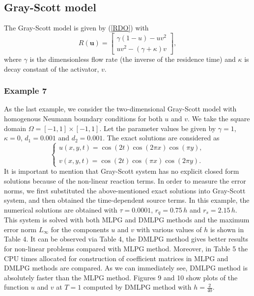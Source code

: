 \documentclass[12pt]{article}
\numberwithin{equation}{section}
\begin{document}
\subsection{Gray-Scott model}
The Gray-Scott model \cite{Fernandes, ZhangK} is given by (\ref{RDO}) with
\begin{equation}
R(\mathbf u) = \left[ \begin{array}{l}
\gamma (1- u )- u{v^2}\\
u{v^2}-(\gamma+\kappa)v
\end{array} \right],\end{equation}
where $\gamma$
is the dimensionless flow rate (the inverse of the residence time) and $\kappa$ is decay constant of the activator, $v$.

\subsubsection{Example 7}
As the last example, we consider the two-dimensional Gray-Scott model with homogenous Neumann boundary conditions for both $u$ and $v$. We take the square domain $\Omega  = [-1,1] \times [-1,1]$. Let the parameter values be given by
$\gamma =1$, $\kappa =0$, $d_1=0.001$ and $d_2=0.001$. The exact solutions are considered as \cite{Fernandes, ZhangK}
\[\left\{ {\begin{array}{*{20}{l}}
{u(x,y,t) = \cos (2t)\cos (2\pi x)\cos (\pi y),}\\
{}\\
{v(x,y,t) = \cos (2t)\cos (\pi x)\cos (2\pi y).}
\end{array}} \right.\]
It is important to mention that Gray-Scott system has no explicit closed form solutions because of the non-linear reaction
terms. In order to measure the error norms, we first substituted the above-mentioned exact solutions into Gray-Scott system, and then
obtained the time-dependent source terms.
In this example, the numerical solutions are obtained with  $\tau=0.0001$, $r_q=0.75\,h$ and $r_s=2.15\,h$. This system is solved with both MLPG and DMLPG methods and
the maximum error norm ${L_\infty }$ for the components $u$ and $v$ with various values
of $h$ is shown in Table 4.
It can be observed via
%
Table 4, the DMLPG method gives better results for non-linear problems   compared with MLPG method. Moreover, in Table 5 the CPU times allocated for construction of coefficient matrices in MLPG and DMLPG methods are
compared. As we can immediately see, DMLPG method is absolutely faster than
the MLPG method.
Figures 9 and 10 show plots of the function $u$ and $v$ at $T=1$ computed by DMLPG method with $h=\frac{2}{{40}}$.
\end{document}
